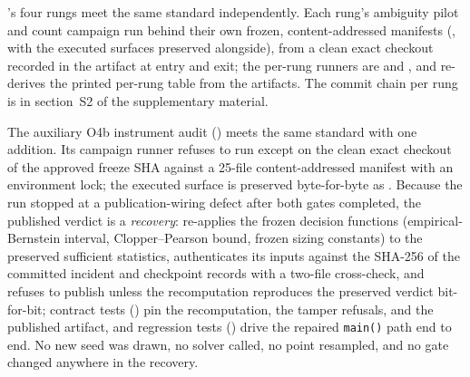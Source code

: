 's four rungs meet the same standard independently. Each
rung's ambiguity pilot and count campaign run behind their own frozen,
content-addressed manifests
(,
with the executed surfaces preserved alongside), from a clean exact
checkout recorded in the artifact at entry and exit; the per-rung runners
are  and
, and
 re-derives
the printed per-rung table from the artifacts. The commit chain per rung
is in section~S2 of the supplementary material.

The auxiliary O4b instrument audit () meets the
same standard with one addition. Its campaign runner refuses to run
except on the clean exact checkout of the approved freeze SHA against a
25-file content-addressed manifest with an environment lock; the executed
surface is preserved byte-for-byte as
. Because
the run stopped at a publication-wiring defect after both gates
completed, the published verdict is a \emph{recovery}:
 re-applies the frozen
decision functions (empirical-Bernstein interval, Clopper--Pearson bound,
frozen sizing constants) to the preserved sufficient statistics,
authenticates its inputs against the SHA-256 of the committed incident
and checkpoint records with a two-file cross-check, and refuses to
publish unless the recomputation reproduces the preserved verdict
bit-for-bit; contract tests () pin
the recomputation, the tamper refusals, and the published artifact, and
regression tests () drive the
repaired \texttt{main()} path end to end. No new seed was drawn, no
solver called, no point resampled, and no gate changed anywhere in the
recovery.
